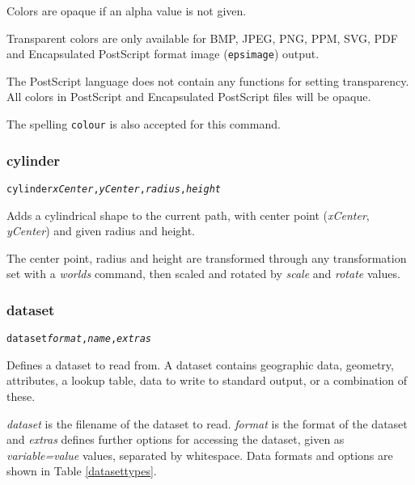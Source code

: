 Colors are opaque if an alpha value is not given.

Transparent colors are only available for BMP, JPEG, PNG, PPM, SVG, PDF
and Encapsulated PostScript format image (\texttt{epsimage}) output.

The PostScript language does not contain any functions for setting
transparency.
All colors in PostScript and Encapsulated PostScript
files will be opaque.

The spelling \texttt{colour} is also accepted for this command.

\subsubsection{cylinder}

\begin{alltt}
cylinder \textit{xCenter}, \textit{yCenter}, \textit{radius}, \textit{height}
\end{alltt}

Adds a cylindrical shape to the current path, with center
point (\textit{xCenter}, \textit{yCenter}) and given radius and height.

The center point, radius and height are transformed through any
transformation set with a \textit{worlds} command,
then scaled and rotated by \textit{scale}
and \textit{rotate} values.

\subsubsection{dataset}

\begin{alltt}
dataset \textit{format}, \textit{name}, \textit{extras}
\end{alltt}

Defines a dataset to read from.  A dataset contains geographic data,
geometry, attributes, a lookup table, data to write to standard
output, or a combination of these.

\textit{dataset} is the filename of the dataset to read.
\textit{format} is the format of the dataset and
\textit{extras} defines further options for accessing the dataset, given
as \textit{variable=value} values, separated by whitespace.
Data formats and options are shown in Table \ref{datasettypes}.


